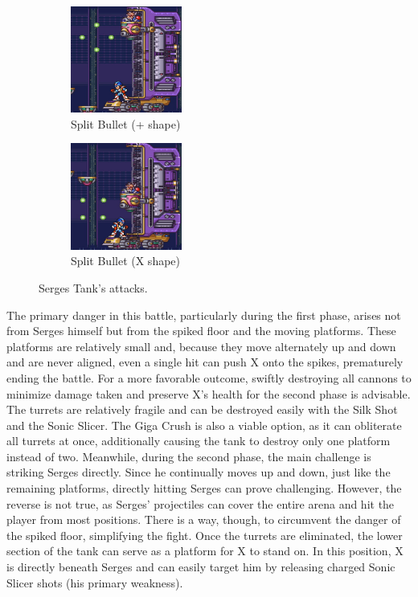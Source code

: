 \begin{figure}[htp]
\begin{subfigure}{.32\linewidth}
		\centering
		\includegraphics[height=3.5cm]{figures/X2/Hunter_stages/Serges_tank_5.jpg}
		\caption{Split Bullet (+ shape)}
	\end{subfigure}
	\begin{subfigure}{.32\linewidth}
		\centering
		\includegraphics[height=3.5cm]{figures/X2/Hunter_stages/Serges_tank_6.jpg}
		\caption{Split Bullet (X shape)}
	\end{subfigure}
	\caption{Serges Tank's attacks.}	
\end{figure}
The primary danger in this battle, particularly during the first phase, arises not from Serges himself but from the spiked floor and the moving platforms. These platforms are relatively small and, because they move alternately up and down and are never aligned, even a single hit can push X onto the spikes, prematurely ending the battle. For a more favorable outcome, swiftly destroying all cannons to minimize damage taken and preserve X's health for the second phase is advisable. The turrets are relatively fragile and can be destroyed easily with the Silk Shot and the Sonic Slicer. The Giga Crush is also a viable option, as it can obliterate all turrets at once, additionally causing the tank to destroy only one platform instead of two. Meanwhile, during the second phase, the main challenge is striking Serges directly. Since he continually moves up and down, just like the remaining platforms, directly hitting Serges can prove challenging. However, the reverse is not true, as Serges' projectiles can cover the entire arena and hit the player from most positions. There is a way, though, to circumvent the danger of the spiked floor, simplifying the fight. Once the turrets are eliminated, the lower section of the tank can serve as a platform for X to stand on. In this position, X is directly beneath Serges and can easily target him by releasing charged Sonic Slicer shots (his primary weakness).

